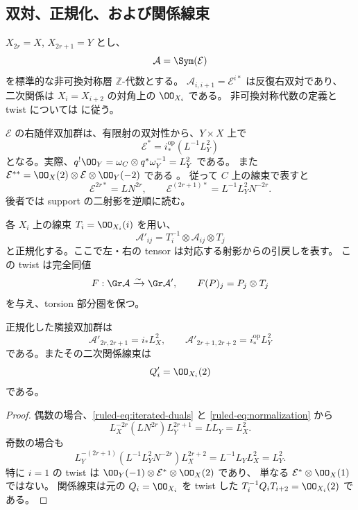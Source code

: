 \subsection{双対、正規化、および関係線束}

$X_{2r}=X$, $X_{2r+1}=Y$ とし、
\[
 \mathcal A=\Sym(\mathcal E)
\]
を標準的な非可換対称層 $\mathbb Z$-代数とする。
$\mathcal A_{i,i+1}=\mathcal E^{i*}$ は反復右双対であり、
二次関係は $X_i=X_{i+2}$ の対角上の $\OO_{X_i}$ である。
非可換対称代数の定義と twist については
\cite[\S5]{VanDenBergh2012P1} に従う。

$\mathcal E$ の右随伴双加群は、有限射の双対性から、$Y\times X$ 上で
\begin{equation}\label{ruled-eq:right-dual}
 \mathcal E^*=i^{\mathrm{op}}_*(L^{-1}L_Y^2)
\end{equation}
となる。実際、$q^!\OO_Y=\omega_C\otimes q^*\omega_Y^{-1}=L_Y^2$ である。
また
$\mathcal E^{**}=\OO_X(2)\otimes\mathcal E\otimes\OO_Y(-2)$
である \cite[Lemma 4.1.7]{VanDenBergh2012P1}。
従って $C$ 上の線束で表すと
\begin{equation}\label{ruled-eq:iterated-duals}
 \mathcal E^{2r*}=L N^{2r},\qquad
 \mathcal E^{(2r+1)*}=L^{-1}L_Y^2N^{-2r}.
\end{equation}
後者では support の二射影を逆順に読む。

各 $X_i$ 上の線束 $T_i=\OO_{X_i}(i)$ を用い、
\begin{equation}\label{ruled-eq:normalization}
 \mathcal A'_{ij}=T_i^{-1}\otimes\mathcal A_{ij}\otimes T_j
\end{equation}
と正規化する。ここで左・右の tensor は対応する射影からの引戻しを表す。
この twist は完全同値
\begin{equation}\label{ruled-eq:twist-equivalence}
 F:\Gr\mathcal A\xrightarrow{\sim}\Gr\mathcal A',\qquad
 F(P)_j=P_j\otimes T_j
\end{equation}
を与え、torsion 部分圏を保つ。

\begin{lemma}\label{ruled-lem:normalized}
正規化した隣接双加群は
\[
 \mathcal A'_{2r,2r+1}=i_*L_X^2,\qquad
 \mathcal A'_{2r+1,2r+2}=i^{\mathrm{op}}_*L_Y^2
\]
である。またその二次関係線束は
\[
 Q'_i=\OO_{X_i}(2)
\]
である。
\end{lemma}

\begin{proof}
偶数の場合、\eqref{ruled-eq:iterated-duals} と \eqref{ruled-eq:normalization} から
\[
 L_X^{-2r}(L N^{2r})L_Y^{2r+1}=L L_Y=L_X^2.
\]
奇数の場合も
\[
 L_Y^{-(2r+1)}(L^{-1}L_Y^2N^{-2r})L_X^{2r+2}
 =L^{-1}L_YL_X^2=L_Y^2.
\]
特に $i=1$ の twist は $\OO_Y(-1)\otimes\mathcal E^*\otimes\OO_X(2)$ であり、
単なる $\mathcal E^*\otimes\OO_X(1)$ ではない。
関係線束は元の $Q_i=\OO_{X_i}$ を twist した
$T_i^{-1}Q_iT_{i+2}=\OO_{X_i}(2)$ である。
\end{proof}

